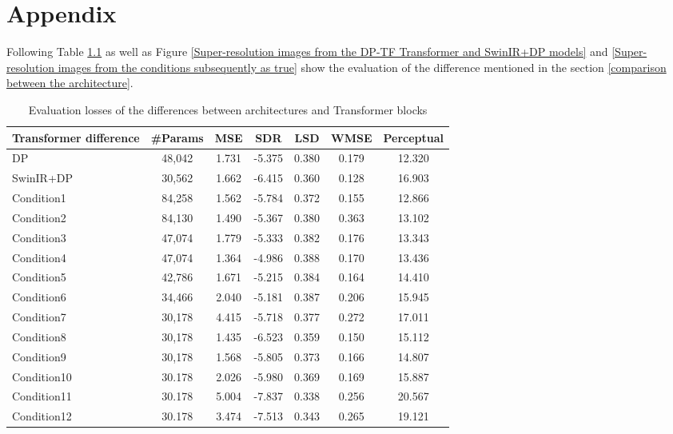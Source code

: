 \appendix
\chapter{Appendix}

Following Table \ref{Evaluation losses of the differences comparison between architectures and Transformer blocks} as well as Figure \ref{Super-resolution images from the DP-TF Transformer and SwinIR+DP models} and \ref{Super-resolution images from the conditions subsequently as true} show the evaluation of the difference mentioned in the section
\ref{comparison between the architecture}.

\begin{table}[!htp]
    \centering
    \caption{Evaluation losses of the differences between architectures and Transformer blocks}
    \label{Evaluation losses of the differences comparison between architectures and Transformer blocks}
    \begin{tabular}{l|c|c|c|c|c|c}
        \hline
        Transformer difference & \#Params & MSE & SDR & LSD & WMSE & Perceptual \\
        \hline
        DP & 48,042 & 1.731 & -5.375 & 0.380 & 0.179 & 12.320\\
        \hline
        SwinIR+DP & 30,562 & 1.662 & -6.415 & 0.360 & 0.128 & 16.903 \\
        \hline
        Condition1 & 84,258 & 1.562 & -5.784 & 0.372 & 0.155 & 12.866 \\
        \hline
        Condition2 & 84,130 & 1.490 & -5.367 & 0.380 & 0.363 & 13.102 \\
        \hline
        Condition3 & 47,074 & 1.779 & -5.333 & 0.382 & 0.176 & 13.343 \\
        \hline
        Condition4 & 47,074 & 1.364 & -4.986 & 0.388 & 0.170 & 13.436 \\
        \hline
        Condition5 & 42,786 & 1.671 & -5.215 & 0.384 & 0.164 & 14.410 \\
        \hline
        Condition6 & 34,466 & 2.040 & -5.181 & 0.387 & 0.206 & 15.945 \\
        \hline
        Condition7 & 30,178 & 4.415 & -5.718 & 0.377 & 0.272 & 17.011 \\
        \hline
        Condition8 & 30,178 & 1.435 & -6.523 & 0.359 & 0.150 & 15.112 \\
        \hline
        Condition9 & 30,178 & 1.568 & -5.805 & 0.373 & 0.166 & 14.807 \\
        \hline
        Condition10 & 30.178 & 2.026 & -5.980 & 0.369 & 0.169 & 15.887 \\
        \hline
        Condition11 & 30.178 & 5.004 & -7.837 & 0.338 & 0.256 & 20.567 \\
        \hline
        Condition12 & 30.178 & 3.474 & -7.513 & 0.343 & 0.265 & 19.121 \\
        \hline
    \end{tabular}
\end{table}


